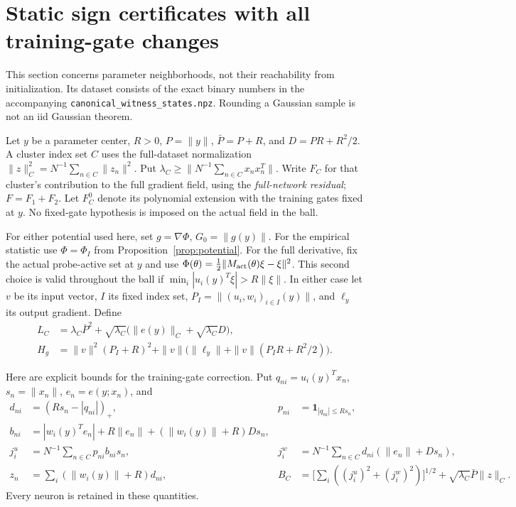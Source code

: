 \section{Static sign certificates with all training-gate changes}
\label{sec:static}
This section concerns parameter neighborhoods, not their reachability from
initialization. Its dataset consists of the exact binary numbers in the
accompanying \texttt{canonical\_witness\_states.npz}. Rounding a Gaussian
sample is not an iid Gaussian theorem.

Let $y$ be a parameter center, $R>0$, $P=\|y\|$, $\bar P=P+R$, and
$D=PR+R^2/2$. A cluster index set $C$ uses the full-dataset normalization
$\|z\|_C^2=N^{-1}\sum_{n\in C}\|z_n\|^2$. Put
$\lambda_C\ge\|N^{-1}\sum_{n\in C}x_nx_n^T\|$.
Write $F_C$ for that cluster's contribution to the full gradient field,
using the \emph{full-network residual}; $F=F_1+F_2$.
Let $F_C^0$ denote its polynomial extension with the training gates fixed
at $y$. No fixed-gate hypothesis is imposed on the actual field in the ball.

For either potential used here, set $g=\nabla\Phi$, $G_0=\|g(y)\|$.
For the empirical statistic use $\Phi=\Phi_I$ from
Proposition~\ref{prop:potential}. For the full derivative, fix the actual
probe-active set at $y$ and use
$\Phi(\theta)=\frac12\|M_{\rm act}(\theta)\xi-\xi\|^2$.
This second choice is valid throughout the ball if
$\min_i|u_i(y)^T\xi|>R\|\xi\|$.
In either case let $v$ be its input vector, $I$ its fixed index set,
$P_I=\|(u_i,w_i)_{i\in I}(y)\|$, and $\ell_y$ its output gradient.
Define
\begin{align*}
 L_C&=\lambda_C\bar P^2+
 \sqrt{\lambda_C}\big(\|e(y)\|_C+\sqrt{\lambda_C}D\big),\\
 H_g&=\|v\|^2(P_I+R)^2+
 \|v\|\big(\|\ell_y\|+\|v\|(P_IR+R^2/2)\big).
\end{align*}

Here are explicit bounds for the training-gate correction. Put
$q_{ni}=u_i(y)^Tx_n$, $s_n=\|x_n\|$, $e_n=e(y;x_n)$, and
\begin{align*}
 d_{ni}&=(Rs_n-|q_{ni}|)_+,&
 p_{ni}&=\mathbf1_{|q_{ni}|\le Rs_n},\\
 b_{ni}&=|w_i(y)^Te_n|+R\|e_n\|
                 +(\|w_i(y)\|+R)Ds_n,\\
 j_i^u&=N^{-1}\sum_{n\in C}p_{ni}b_{ni}s_n,&
 j_i^w&=N^{-1}\sum_{n\in C}d_{ni}(\|e_n\|+Ds_n),\\
 z_n&=\sum_i(\|w_i(y)\|+R)d_{ni},&
 B_C&=\Big[\sum_i((j_i^u)^2+(j_i^w)^2)\Big]^{1/2}
                  +\sqrt{\lambda_C}\bar P\|z\|_C.
\end{align*}
Every neuron is retained in these quantities.

